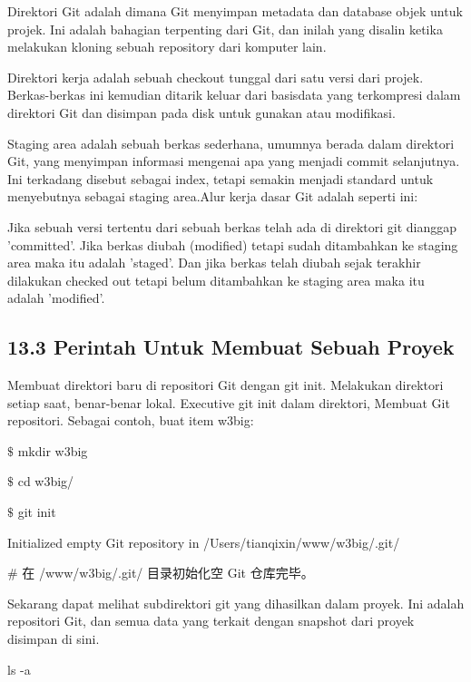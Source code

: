 \hspace*{0.5in} Direktori Git adalah dimana Git menyimpan metadata dan database objek untuk projek. Ini adalah bahagian terpenting dari Git, dan inilah yang disalin ketika melakukan kloning sebuah repository dari komputer lain. \par
\noindent 
\hspace*{0.5in} Direktori kerja adalah sebuah checkout tunggal dari satu versi dari projek. Berkas-berkas ini kemudian ditarik keluar dari basisdata yang terkompresi dalam direktori Git dan disimpan pada disk untuk gunakan atau modifikasi. \par
\hspace*{0.5in} Staging area adalah sebuah berkas sederhana, umumnya berada dalam direktori Git, yang menyimpan informasi mengenai apa yang menjadi commit selanjutnya. Ini terkadang disebut sebagai index, tetapi semakin menjadi standard untuk menyebutnya sebagai staging area.Alur kerja dasar Git adalah seperti ini: \par
\noindent 
 \par
\hspace*{0.5in} Jika sebuah versi tertentu dari sebuah berkas telah ada di direktori git dianggap 'committed'. Jika berkas diubah (modified) tetapi sudah ditambahkan ke staging area  maka itu adalah 'staged'. Dan jika berkas telah diubah sejak terakhir dilakukan checked out tetapi belum ditambahkan ke staging area maka itu adalah 'modified'.  \par

\subsection*{13.3 Perintah Untuk Membuat Sebuah Proyek }
\hspace*{0.5in} Membuat direktori baru di repositori Git dengan git init. Melakukan direktori setiap saat, benar-benar lokal. Executive git init dalam direktori, Membuat Git repositori. Sebagai contoh, buat item w3big:  \par
\noindent 
{\fontsize{10pt}{10pt}\selectfont  $  \$  $ mkdir w3big} \par
\noindent 
{\fontsize{10pt}{10pt}\selectfont  $  \$  $ cd w3big/} \par
\noindent 
{\fontsize{10pt}{10pt}\selectfont  $  \$  $ git init} \par
\noindent 
{\fontsize{10pt}{10pt}\selectfont Initialized empty Git repository in /Users/tianqixin/www/w3big/.git/} \par
\noindent 
{\fontsize{10pt}{10pt}\selectfont  $  \#  $ 在 /www/w3big/.git/ 目录初始化空 Git 仓库完毕。} \par
\vspace{14pt}
\hspace*{0.5in} Sekarang dapat melihat subdirektori git yang dihasilkan dalam proyek. Ini adalah repositori Git, dan semua data yang terkait dengan snapshot dari proyek disimpan di sini. \par
\noindent 
{\fontsize{10pt}{10pt}\selectfont ls -a} \par

